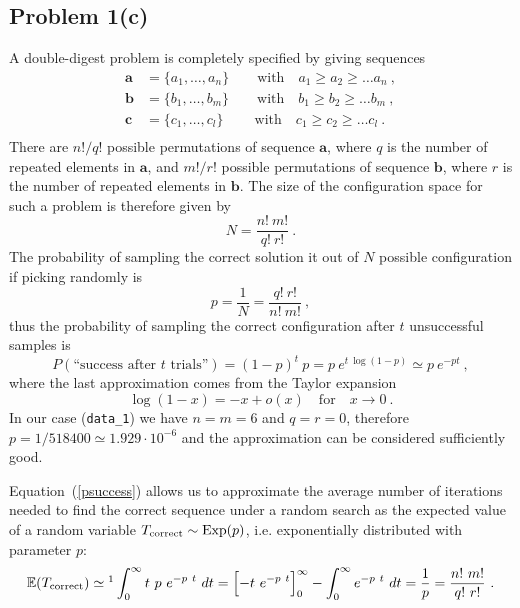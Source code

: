 \documentclass[12pt,A4,titlepage]{article}
\begin{document}
\clearpage



\subsection*{Problem 1(c)}

A double-digest problem is completely specified by giving sequences
\begin{align*}
\bm{a} &= \lbrace a_1, \ldots, a_n \rbrace \qquad \text{with} \quad a_1 \geq a_2 \geq \ldots a_n \ , \\
\bm{b} &= \lbrace b_1, \ldots, b_m \rbrace \qquad \text{with} \quad b_1 \geq b_2 \geq \ldots b_m \ , \\
\bm{c} &= \lbrace c_1, \ldots, c_l \rbrace \qquad \ \text{with} \quad c_1 \geq c_2 \geq \ldots c_l \ . \\
\end{align*}
There are $n!/q!$ possible permutations of sequence $\bm{a}$, where $q$ is the number of repeated elements in $\bm{a}$, and $m!/r!$ possible permutations of sequence $\bm{b}$, where $r$ is the number of repeated elements in $\bm{b}$. The size of the configuration space for such a problem is therefore given by
\[
N = \dfrac{n! \ m!}{q! \ r!} \ .
\]
The probability of sampling the correct solution it out of $N$ possible configuration if picking randomly is
\begin{equation}
p = \dfrac{1}{N} = \dfrac{q! \ r!}{n! \ m!} \ ,
\end{equation}
thus the probability of sampling the correct configuration after $t$ unsuccessful samples is
\begin{equation}
P(\text{``success after $t$ trials''}) = (1-p)^t \ p = p \ e^{t \ \log(1-p)} \simeq p \ e^{-pt} \ ,
\label{psuccess}
\end{equation}
where the last approximation comes from the Taylor expansion 
\[
\log(1-x) = -x + o(x) \quad \text{for} \quad x \rightarrow 0 \ .
\]
In our case (\texttt{data\_1}) we have $n = m = 6$ and $q = r = 0$, therefore $p = 1/518400 \simeq 1.929\cdot10^{-6}$ and the approximation can be considered sufficiently good. 

Equation~(\ref{psuccess}) allows us to approximate the average number of iterations needed to find the correct sequence under a random search as the expected value of a random variable $T_{\textup{correct}} \sim \text{Exp}(p)$, i.e. exponentially distributed with parameter $p$:
\begin{equation}
\mathbb{E}(T_{\textup{correct}}) \simeq\footnotemark \int_0^\infty t \ p \ e^{-p\ t} \ dt = \Bigl[ -t \ e^{-p\ t} \Bigr]_0^{\infty} - \int_0^\infty e^{-p\ t} \ dt = \dfrac{1}{p} = \dfrac{n! \ m!}{q! \ r!} \ .
\end{equation}
\end{document}
